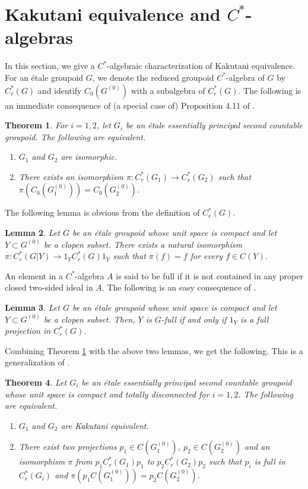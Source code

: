 \documentclass[11pt]{article}
\newtheorem{thm}{Theorem}[section]
\newtheorem{lem}[thm]{Lemma}
\theoremstyle{definition}
\begin{document}
\section{Kakutani equivalence and $C^*$-algebras}

In this section, 
we give a $C^*$-algebraic characterization of Kakutani equivalence. 
For an \'etale groupoid $G$, 
we denote the reduced groupoid $C^*$-algebra of $G$ by $C^*_r(G)$ and 
identify $C_0(G^{(0)})$ with a subalgebra of $C^*_r(G)$. 
The following is an immediate consequence of (a special case of) 
Proposition 4.11 of \cite{R3}. 

\begin{thm}\label{isomC*}
For $i=1,2$, 
let $G_i$ be an \'etale essentially principal second countable groupoid. 
The following are equivalent. 
\begin{enumerate}
\item $G_1$ and $G_2$ are isomorphic. 
\item There exists an isomorphism $\pi:C^*_r(G_1)\to C^*_r(G_2)$ 
such that $\pi(C_0(G_1^{(0)}))=C_0(G_2^{(0)})$. 
\end{enumerate}
\end{thm}

The following lemma is obvious from the definition of $C^*_r(G)$. 

\begin{lem}
Let $G$ be an \'etale groupoid whose unit space is compact and 
let $Y\subset G^{(0)}$ be a clopen subset. 
There exists a natural isomorphism $\pi:C^*_r(G|Y)\to1_YC^*_r(G)1_Y$ 
such that $\pi(f)=f$ for every $f\in C(Y)$. 
\end{lem}

An element in a $C^*$-algebra $A$ is said to be full 
if it is not contained in any proper closed two-sided ideal in $A$.
The following is an easy consequence of \cite[Proposition II.4.5]{R1}. 

\begin{lem}
Let $G$ be an \'etale groupoid whose unit space is compact and 
let $Y\subset G^{(0)}$ be a clopen subset. 
Then, $Y$ is $G$-full if and only if 
$1_Y$ is a full projection in $C^*_r(G)$. 
\end{lem}

Combining Theorem \ref{isomC*} with the above two lemmas, 
we get the following. 
This is a generalization of \cite[Theorem 2.4]{LaO}. 

\begin{thm}\label{C*Kakutani}
Let $G_i$ be an \'etale essentially principal second countable groupoid 
whose unit space is compact and totally disconnected for $i=1,2$. 
The following are equivalent. 
\begin{enumerate}
\item $G_1$ and $G_2$ are Kakutani equivalent. 
\item There exist two projections $p_1\in C(G_1^{(0)})$, $p_2\in C(G_2^{(0)})$ 
and an isomorphism $\pi$ from $p_1C^*_r(G_1)p_1$ to $p_2C^*_r(G_2)p_2$ 
such that $p_i$ is full in $C^*_r(G_i)$ and 
$\pi(p_1C(G_1^{(0)}))=p_2C(G_2^{(0)})$. 
\end{enumerate}
\end{thm}
\end{document}

